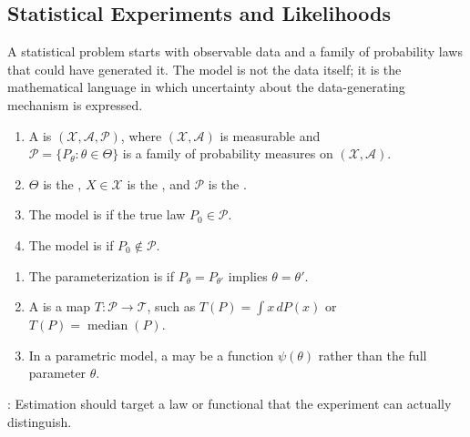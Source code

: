 \subsection{Statistical Experiments and Likelihoods}

A statistical problem starts with observable data and a family of probability laws that could have generated it.  The model is not the data itself; it is the mathematical language in which uncertainty about the data-generating mechanism is expressed.

\begin{definition} \label{def:statistical-experiment-and-model} 
\begin{enumerate}[label=(\roman*)]
\setlength{\itemsep}{0pt}
\item A  is $(\mathcal{X},\mathcal{A},\mathcal{P})$, where $(\mathcal{X},\mathcal{A})$ is measurable and\\
$\mathcal{P}=\{P_\theta:\theta\in\Theta\}$ is a family of probability measures on $(\mathcal{X},\mathcal{A})$.
\item $\Theta$ is the , $X\in\mathcal{X}$ is the , and $\mathcal{P}$ is the .
\item The model is  if the true law $P_0\in\mathcal{P}$.
\item The model is  if $P_0\notin\mathcal{P}$.
\end{enumerate}
\end{definition}

\begin{definition} \label{def:identifiability-and-parametric-functionals} 
\begin{enumerate}[label=(\roman*)]
\setlength{\itemsep}{0pt}
\item The parameterization is  if $P_\theta=P_{\theta'}$ implies $\theta=\theta'$.
\item A  is a map $T:\mathcal{P}\to\mathcal{T}$, such as $T(P)=\int x\,dP(x)$ or $T(P)=\operatorname{median}(P)$.
\item In a parametric model, a  may be a function $\psi(\theta)$ rather than the full parameter $\theta$.
\end{enumerate}
: Estimation should target a law or functional that the experiment can actually distinguish.
\end{definition}

